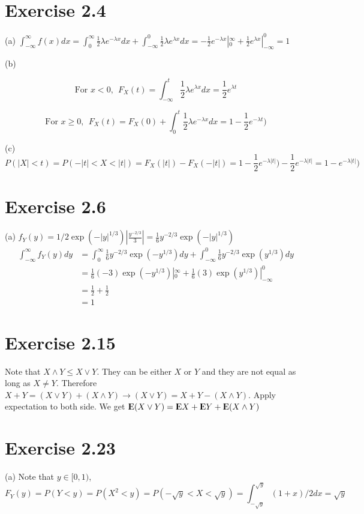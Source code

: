 \documentclass[12pt]{article}
\begin{document}
\section*{Exercise 2.4}
(a) $\int^{\infty}_{-\infty} f(x)dx =  \int^{\infty}_0 \frac{1}{2}\lambda e^{-\lambda x} dx + \int^0_{-\infty} \frac{1}{2}\lambda e^{\lambda x} dx  = -\frac{1}{2} e^{-\lambda x} |^{\infty}_0 + \frac{1}{2} e^{\lambda x} |_{-\infty}^0 = 1$

(b) 

$$\mbox{For } x < 0,\ \  F_X(t) = \int^t_{-\infty} \frac{1}{2}\lambda e^{\lambda x} dx = \frac{1}{2} e^{\lambda t} $$

$$\mbox{For } x \geq 0, \ \  F_X(t) = F_X(0) + \int^{t}_0 \frac{1}{2}\lambda e^{-\lambda x} dx =1 - \frac{1}{2}e^{-\lambda t})$$


(c) $$P(|X| < t) = P(-|t| < X < |t|) = F_X(|t|) - F_X(-|t|) = 1-  \frac{1}{2}e^{-\lambda |t|}) - \frac{1}{2} e^{- \lambda |t|} =  1 - e^{-\lambda |t|})$$

\section*{Exercise 2.6}
(a) $f_Y(y) = 1/2 \exp(-|y|^{1/3}) |\frac{y^{-2/3}}{3}| = \frac{1}{6} y^{-2/3} \exp(-|y|^{1/3})$
$$\begin{aligned}
\int_{-\infty}^{\infty} f_Y(y)dy &= \int_{0}^{\infty} \frac{1}{6} y^{-2/3} \exp(-y^{1/3}) dy + \int_{-\infty}^{0} \frac{1}{6} y^{-2/3} \exp(y^{1/3}) dy \\
&=  \frac{1}{6} (-3)\exp(-y^{1/3}) |_{0}^{\infty} + \frac{1}{6} (3) \exp(y^{1/3}) |_{-\infty}^{0} \\
&=  \frac{1}{2} + \frac{1}{2} \\
&= 1
\end{aligned}
$$

\section*{Exercise 2.15}
Note that $X \wedge Y \leq X\vee Y$. They can be either $X$ or $Y$ and they are not equal as long as $X\neq Y$. Therefore $X+Y = (X \vee Y) + (X \wedge Y) \rightarrow (X \vee Y) = X+Y - (X \wedge Y)$. Apply expectation to both side. We get ${\rm I\kern-.3em E}(X \vee Y) = {\rm I\kern-.3em E} X + {\rm I\kern-.3em E} Y + {\rm I\kern-.3em E}(X \wedge Y)$

\section*{Exercise 2.23}
(a) Note that $y \in [0, 1)$, $$F_Y(y) = P(Y < y) = P(X^2 < y) = P(-\sqrt{y} < X < \sqrt{y}) = \int^{\sqrt{y}}_{-\sqrt{y}} (1+x)/2 dx = \sqrt{y}$$
\end{document}
